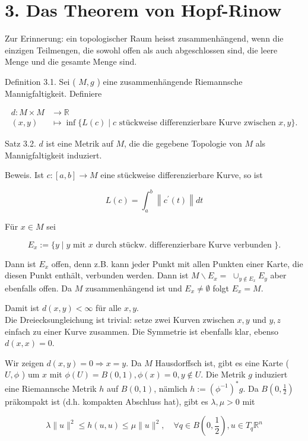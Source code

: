 \documentclass[10pt]{article}
\begin{document}
\section*{3. Das Theorem von Hopf-Rinow}
Zur Erinnerung: ein topologischer Raum heisst zusammenhängend, wenn die einzigen Teilmengen, die sowohl offen als auch abgeschlossen sind, die leere Menge und die gesamte Menge sind.

Definition 3.1. Sei ( $M, g$ ) eine zusammenhängende Riemannsche Mannigfaltigkeit. Definiere

$$
\begin{aligned}
d: M \times M & \rightarrow \mathbb{R} \\
(x, y) & \mapsto \inf \{L(c) \mid c \text { stückweise differenzierbare Kurve zwischen } x, y\} .
\end{aligned}
$$

Satz 3.2. $d$ ist eine Metrik auf $M$, die die gegebene Topologie von $M$ als Mannigfaltigkeit induziert.

Beweis. Ist $c:[a, b] \rightarrow M$ eine stückweise differenzierbare Kurve, so ist

$$
L(c)=\int_{a}^{b}\left\|c^{\prime}(t)\right\| d t
$$

Für $x \in M$ sei

$$
E_{x}:=\{y \mid y \text { mit } x \text { durch stückw. differenzierbare Kurve verbunden }\} .
$$

Dann ist $E_{x}$ offen, denn z.B. kann jeder Punkt mit allen Punkten einer Karte, die diesen Punkt enthält, verbunden werden. Dann ist $M \backslash E_{x}=$ $\cup_{y \notin E_{x}} E_{y}$ aber ebenfalls offen. Da $M$ zusammenhängend ist und $E_{x} \neq \emptyset$ folgt $E_{x}=M$.

Damit ist $d(x, y)<\infty$ für alle $x, y$.\\
Die Dreiecksungleichung ist trivial: setze zwei Kurven zwischen $x, y$ und $y, z$ einfach zu einer Kurve zusammen. Die Symmetrie ist ebenfalls klar, ebenso $d(x, x)=0$.

Wir zeigen $d(x, y)=0 \Longrightarrow x=y$. Da $M$ Hausdorffsch ist, gibt es eine Karte ( $U, \phi$ ) um $x$ mit $\phi(U)=B(0,1), \phi(x)=0, y \notin U$. Die Metrik $g$ induziert eine Riemannsche Metrik $h$ auf $B(0,1)$, nämlich $h:=\left(\phi^{-1}\right)^{*} g$. Da $B\left(0, \frac{1}{2}\right)$ präkompakt ist (d.h. kompakten Abschluss hat), gibt es $\lambda, \mu>0$ mit

$$
\lambda\|u\|^{2} \leq h(u, u) \leq \mu\|u\|^{2}, \quad \forall q \in B\left(0, \frac{1}{2}\right), u \in T_{q} \mathbb{R}^{n}
$$
\end{document}
